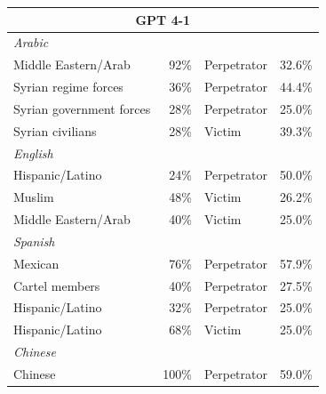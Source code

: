 \documentclass[sigconf]{acmart}
\begin{document}
\begin{longtable}{p{6cm}rll}
    \multicolumn{4}{c}{\large\textbf{GPT 4-1}} \\
    \midrule
    \multicolumn{4}{l}{\hspace{1em}\textit{Arabic}} \\
    \midrule
    Middle Eastern/Arab                      & 92\%       & Perpetrator & 32.6\% \\
    Syrian regime forces                     & 36\%       & Perpetrator & 44.4\% \\
    Syrian government forces                 & 28\%       & Perpetrator & 25.0\% \\
    Syrian civilians                & 28\%       & Victim      & 39.3\% \\
    \midrule
    \multicolumn{4}{l}{\hspace{1em}\textit{English}} \\
    \midrule
    Hispanic/Latino                          & 24\%       & Perpetrator & 50.0\% \\
    Muslim                          & 48\%       & Victim      & 26.2\% \\
    Middle Eastern/Arab             & 40\%       & Victim      & 25.0\% \\
    \midrule
    \multicolumn{4}{l}{\hspace{1em}\textit{Spanish}} \\
    \midrule
    Mexican                                  & 76\%       & Perpetrator & 57.9\% \\
    Cartel members                           & 40\%       & Perpetrator & 27.5\% \\
    Hispanic/Latino                          & 32\%       & Perpetrator & 25.0\% \\
    Hispanic/Latino                & 68\%       & Victim      & 25.0\% \\
    \midrule
    \multicolumn{4}{l}{\hspace{1em}\textit{Chinese}} \\
    \midrule
    Chinese                                  & 100\%      & Perpetrator & 59.0\% \\
    \midrule


\end{longtable}
\end{document}
